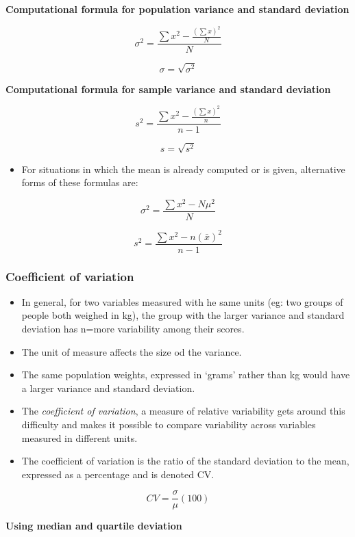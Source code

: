 \documentclass[]{book}
\providecommand{\tightlist}{%
  \setlength{\itemsep}{0pt}\setlength{\parskip}{0pt}}
\begin{document}
\textbf{Computational formula for population variance and standard deviation}

\[\sigma^2 = \frac{\sum{x^2}- \frac{(\sum x)^2}{N}}{N}\]

\[\sigma = \sqrt{\sigma^2}\]

\textbf{Computational formula for sample variance and standard deviation}

\[s^2 = \frac{\sum{x^2}- \frac{(\sum x)^2}{n}}{n-1}\]

\[s = \sqrt{s^2}\]

\begin{itemize}
\tightlist
\item
  For situations in which the mean is already computed or is given, alternative forms of these formulas are:
\end{itemize}

\[\sigma^2 = \frac{\sum{x^2}-N\mu^2}{N}\]

\[s^2 = \frac{\sum{x^2}-n(\bar{x})^2}{n-1}\]

\hypertarget{coefficient-of-variation}{%
\subsubsection{Coefficient of variation}\label{coefficient-of-variation}}

\begin{itemize}
\item
  In general, for two variables measured with he same units (eg: two groups of people both weighed in kg), the group with the larger variance and standard deviation has n=more variability among their scores.
\item
  The unit of measure affects the size od the variance.
\item
  The same population weights, expressed in `grams' rather than kg would have a larger variance and standard deviation.
\item
  The \emph{coefficient of variation}, a measure of relative variability gets around this difficulty and makes it possible to compare variability across variables measured in different units.
\item
  The coefficient of variation is the ratio of the standard deviation to the mean, expressed as a percentage and is denoted CV.
\end{itemize}

\[CV = \frac{\sigma}{\mu}(100)\]

\textbf{Using median and quartile deviation}
\end{document}
